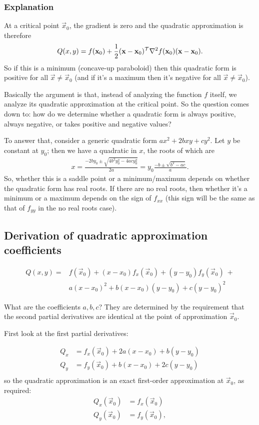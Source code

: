 \subsubsection*{Explanation}
At a critical point $\vec x_0$, the gradient is zero and the quadratic approximation is therefore
$$
Q(x, y) = f(\mathbf x_0) + \frac{1}{2}(\mathbf x - \mathbf x_0)^\mathcal T \nabla^2 f(\mathbf x_0)(\mathbf x - \mathbf x_0).
$$
So if this is a minimum (concave-up paraboloid) then this quadratic form is
positive for all $\vec x \neq \vec x_0$ (and if it's a maximum then it's
negative for all $\vec x \neq \vec x_0$).

Basically the argument is that, instead of analyzing the function $f$ itself,
we analyze its quadratic approximation at the critical point. So the question
comes down to: how do we determine whether a quadratic form is always positive,
always negative, or takes positive and negative values?

To answer that, consider a generic quadratic form $ax^2 + 2bxy + cy^2$. Let $y$
be constant at $y_0$; then we have a quadratic in $x$, the roots of which are
\begin{align*}
  x
  = \frac{-2by_0 \pm \sqrt{4b^2y_0^2 - 4acy_0^2}}{2a}
  = y_0\frac{-b \pm \sqrt{b^2 - ac}}{a}.
\end{align*}
So, whether this is a saddle point or a minimum/maximum depends on whether the
quadratic form has real roots. If there are no real roots, then whether it's a
minimum or a maximum depends on the sign of $f_{xx}$ (this sign will be the
same as that of $f_{yy}$ in the no real roots case).

\subsection{Derivation of quadratic approximation coefficients}
\begin{align*}
Q(x, y) =
&f(\vec x_0) + (x - x_0)f_x(\vec x_0) +
(y - y_0)f_y(\vec x_0) ~+ \\
&a(x - x_0)^2 +
b(x - x_0)(y - y_0) +
c(y - y_0)^2
\end{align*}

What are the coefficients $a,b,c$? They are determined by the requirement that
the second partial derivatives are identical at the point of approximation
$\vec x_0$.

First look at the first partial derivatives:

\begin{align*}
  Q_x &= f_x(\vec x_0) + 2a(x - x_0) + b(y - y_0)\\
  Q_y &= f_y(\vec x_0) + b(x - x_0) + 2c(y - y_0)\\
\end{align*}
so the quadratic approximation is an exact first-order approximation at $\vec x_0$, as required:
\begin{align*}
  Q_x(\vec x_0) &= f_x(\vec x_0) \\
  Q_y(\vec x_0) &= f_y(\vec x_0),
\end{align*}

